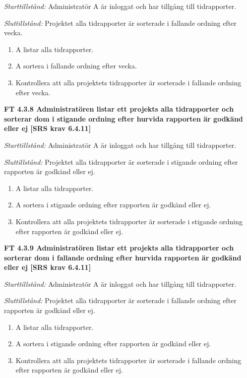 \documentclass[a4paper]{article}
\begin{document}
\emph{Starttillstånd:} Administratör A är inloggat och har tillgång till tidrapporter.

\emph{Sluttillstånd:} Projektet alla tidrapporter är sorterade i fallande ordning efter vecka.

\begin{enumerate}
\item A listar alla tidrapporter.
\item A sortera i fallande ordning efter vecka.
\item Kontrollera att alla projektets tidrapporter är sorterade i fallande ordning efter vecka.
\end{enumerate}

\textbf{FT 4.3.8 Administratören listar ett projekts alla tidrapporter och sorterar dom i stigande ordning efter hurvida rapporten är godkänd eller ej [SRS krav 6.4.11]}

\emph{Starttillstånd:} Administratör A är inloggat och har tillgång till tidrapporter.

\emph{Sluttillstånd:} Projektet alla tidrapporter är sorterade i stigande ordning efter rapporten är godkänd eller ej.

\begin{enumerate}
\item A listar alla tidrapporter.
\item A sortera i stigande ordning efter rapporten är godkänd eller ej.
\item Kontrollera att alla projektets tidrapporter är sorterade i stigande ordning efter rapporten är godkänd eller ej.
\end{enumerate}

\textbf{FT 4.3.9 Administratören listar ett projekts alla tidrapporter och sorterar dom i fallande ordning efter hurvida rapporten är godkänd eller ej [SRS krav 6.4.11]}

\emph{Starttillstånd:} Administratör A är inloggat och har tillgång till tidrapporter.

\emph{Sluttillstånd:} Projektet alla tidrapporter är sorterade i fallande ordning efter rapporten är godkänd eller ej.

\begin{enumerate}
\item A listar alla tidrapporter.
\item A sortera i stigande ordning efter rapporten är godkänd eller ej.
\item Kontrollera att alla projektets tidrapporter är sorterade i fallande ordning efter rapporten är godkänd eller ej.
\end{enumerate}
\end{document}
